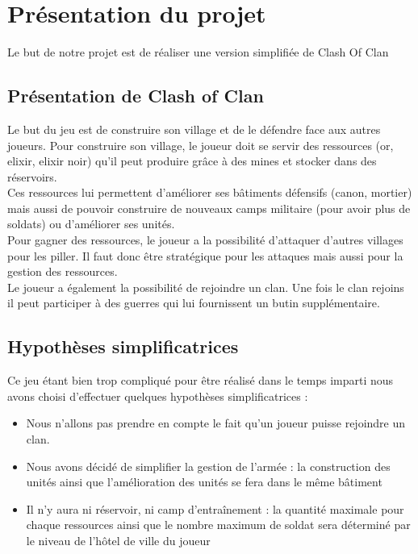 \chapter{Présentation du projet}
	Le but de notre projet est de réaliser une version simplifiée de Clash Of Clan

    \section{Présentation de Clash of Clan}
		Le but du jeu est de construire son village et de le défendre face aux autres joueurs. Pour construire son village, le joueur doit se servir des ressources (or, elixir, elixir noir) qu'il peut produire grâce à des mines et stocker dans des réservoirs. \\
		Ces ressources lui permettent d'améliorer ses bâtiments défensifs (canon, mortier) mais aussi de pouvoir construire de nouveaux camps militaire (pour avoir plus de soldats) ou d'améliorer ses unités. \\
		Pour gagner des ressources, le joueur a la possibilité d'attaquer d'autres villages pour les piller. Il faut donc être stratégique pour les attaques mais aussi pour la gestion des ressources. \\
		Le joueur a également la possibilité de rejoindre un clan. Une fois le clan rejoins il peut participer à des guerres qui lui fournissent un butin supplémentaire.      
        
    \section{Hypothèses simplificatrices}
		Ce jeu étant bien trop compliqué pour être réalisé dans le temps imparti nous avons choisi d'effectuer quelques hypothèses simplificatrices : 
\begin{itemize}
\item Nous n'allons pas prendre en compte le fait qu'un joueur puisse rejoindre un clan. 
\item Nous avons décidé de simplifier la gestion de l'armée : la construction des unités ainsi que l'amélioration des unités se fera dans le même bâtiment
\item Il n'y aura ni réservoir, ni camp d’entraînement : la quantité maximale pour chaque ressources ainsi que le nombre maximum de soldat sera déterminé par le niveau de l'hôtel de ville du joueur
\end{itemize}
